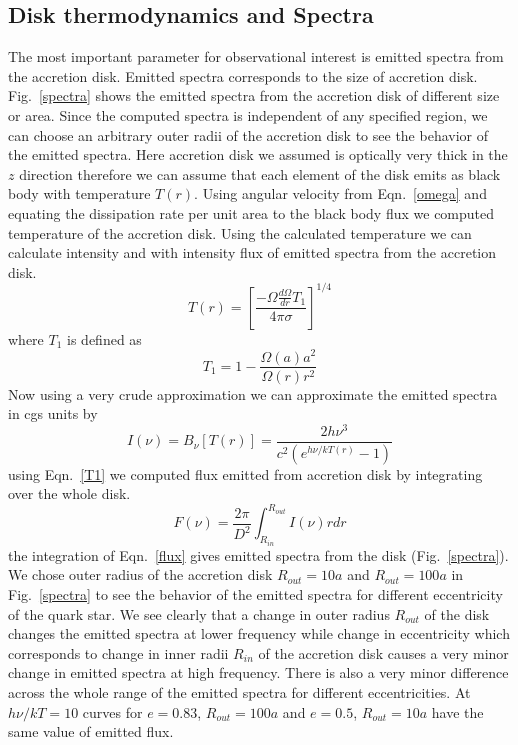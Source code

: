 \documentclass[useAMS,usenatbib]{mn2e}
\begin{document}
\subsection{Disk thermodynamics and Spectra}
The most important parameter for observational interest is emitted spectra from the accretion disk. Emitted spectra corresponds to the size of accretion disk. Fig.~\ref{spectra} shows the emitted spectra from the accretion disk of different size or area. Since the computed spectra is independent of any specified region, we can choose an arbitrary outer radii of the accretion disk to see the behavior of the emitted spectra. Here accretion disk we assumed is optically very thick in the $z$ direction therefore we can assume that each element of the disk emits as black body with temperature $T(r)$. Using angular velocity from Eqn.~\ref{omega} and equating the dissipation rate per unit area to the black body flux we computed temperature of the accretion disk. Using the calculated temperature we can calculate intensity and with intensity flux of emitted spectra from the accretion disk.
\begin{equation}
T(r) = \left[\frac{-\Omega\frac{d\Omega}{dr}T_1}{4\pi\sigma}\right]^{1/4}
\end{equation}
where $T_1$ is defined as
\begin{equation}
T_1 = 1 - \frac{\Omega(a)a^2}{\Omega(r)r^2}
\label{T1}
\end{equation}
Now using a very crude approximation we can approximate the emitted spectra in cgs units by
\begin{equation}
I(\nu) = B_{\nu}[T(r)] = \frac{2h\nu^3}{c^2(e^{h\nu/kT(r)} -1)}
\end{equation}
using Eqn.~\ref{T1} we computed flux emitted from accretion disk by integrating over the whole disk.
\begin{equation}
F(\nu) = \frac{2\pi}{D^2}\int^{R_{out}}_{R_{in}}I(\nu)rdr
\label{flux}
\end{equation}
the integration of Eqn.~\ref{flux} gives emitted spectra from the disk (Fig.~\ref{spectra}). We chose outer radius of the accretion disk $R_{out} = 10a$ and $R_{out} = 100a$ in Fig.~\ref{spectra} to see the behavior of the emitted spectra for different eccentricity of the quark star. We see clearly that a change in outer radius $R_{out}$ of the disk changes the emitted spectra at lower frequency while change in eccentricity which corresponds to change in inner radii $R_{in}$ of the accretion disk causes a very minor change in emitted spectra at high frequency. There is also a very minor difference across the whole range of the emitted spectra for different eccentricities. At $h\nu/kT = 10$ curves for $e = 0.83$, $R_{out} = 100a$ and $e = 0.5$, $R_{out} = 10a$ have the same value of emitted flux.
\end{document}
